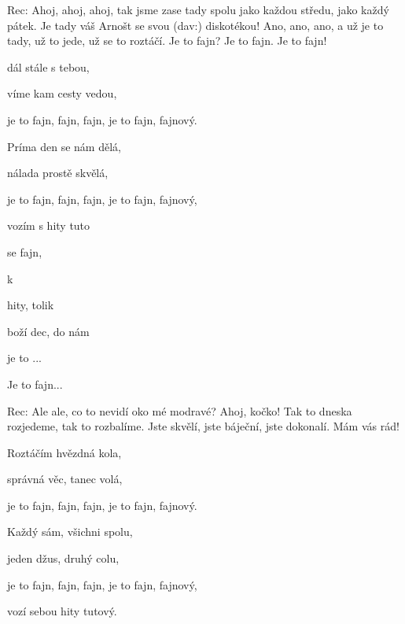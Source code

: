 


Rec: Ahoj, ahoj, ahoj, tak jsme zase tady spolu jako každou středu, jako každý pátek. Je tady váš Arnošt se svou (dav:) diskotékou! Ano, ano, ano, a už je to tady, už to jede, už se to roztáčí. Je to fajn? Je to fajn. Je to fajn!




\zs
{} dál stále s tebou,

víme kam cesty vedou,

je to fajn, fajn, fajn, je to fajn, fajnový.

Príma den se nám dělá,

nálada prostě skvělá,

je to fajn, fajn, fajn, je to fajn, fajnový,

vozím s  hity tuto
\ks




\zr
{} se  fajn,  

 k  

  hity,  tolik 

 boží dec, do  nám 

je to ...

Je to fajn...
\kr

Rec: Ale ale, co to nevidí oko mé modravé? Ahoj, kočko! Tak to dneska rozjedeme, tak to rozbalíme. Jste skvělí, jste báječní, jste dokonalí. Mám vás rád!


\zs
Roztáčím hvězdná kola,

správná věc, tanec volá,

je to fajn, fajn, fajn, je to fajn, fajnový.

Každý sám, všichni spolu,

jeden džus, druhý colu,

je to fajn, fajn, fajn, je to fajn, fajnový,

vozí sebou hity tutový.
\ks

\zr \kr

\zr \kr

\kp

